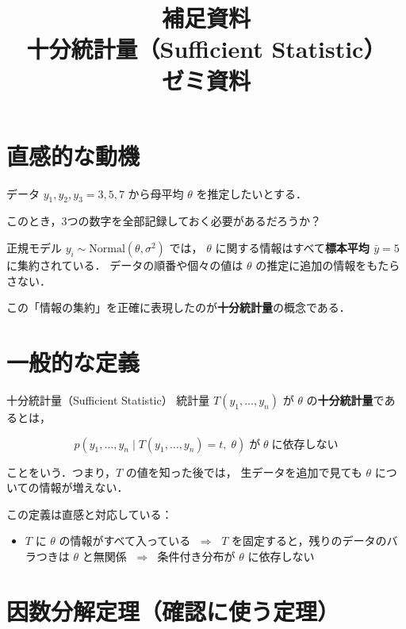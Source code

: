 \documentclass[lualatex,ja=standard,a4paper,12pt]{bxjsarticle}
\title{補足資料 \\[6pt]
       \textbf{十分統計量（Sufficient Statistic）} \\[4pt]
       {\normalsize ゼミ資料}}
\author{}
\date{}
\begin{document}
\maketitle
\thispagestyle{empty}

\section{直感的な動機}

データ $y_1, y_2, y_3 = 3, 5, 7$ から母平均 $\theta$ を推定したいとする．

このとき，3つの数字を全部記録しておく必要があるだろうか？

\medskip
正規モデル $y_i \sim \mathrm{Normal}(\theta, \sigma^2)$ では，
$\theta$ に関する情報はすべて\textbf{標本平均 $\bar{y} = 5$} に集約されている．
データの順番や個々の値は $\theta$ の推定に追加の情報をもたらさない．

\medskip
この「情報の集約」を正確に表現したのが\textbf{十分統計量}の概念である．

\section{一般的な定義}

\begin{defbox}{十分統計量（Sufficient Statistic）}
統計量 $T(y_1,\ldots,y_n)$ が $\theta$ の\textbf{十分統計量}であるとは，

\[
  p(y_1,\ldots,y_n \mid T(y_1,\ldots,y_n) = t,\; \theta)
  \;\text{が}\; \theta \;\text{に依存しない}
\]

ことをいう．つまり，$T$ の値を知った後では，
生データを追加で見ても $\theta$ についての情報が増えない．
\end{defbox}

\medskip
\noindent この定義は直感と対応している：

\begin{itemize}
  \item $T$ に $\theta$ の情報がすべて入っている
        $\;\Rightarrow\;$ $T$ を固定すると，残りのデータのバラつきは $\theta$ と無関係
        $\;\Rightarrow\;$ 条件付き分布が $\theta$ に依存しない
\end{itemize}

\section{因数分解定理（確認に使う定理）}
\end{document}
